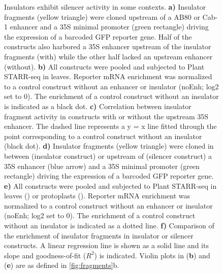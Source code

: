 \documentclass[10pt]{article}
\newcommand{\fignormal}{\scriptsize} %
\newcommand{\usename}[1]{\csname#1\endcsname}
\newif\ifnpc
\newcounter{fig}
\newenvironment{fig}{%
	\begin{figure}[p]%
		\stepcounter{fig}%
		\pdfbookmark{\figurename\ \thefig}{figure\thefig}%
		\tikzsetnextfilename{figure\thefig}%
		\fignormal%
		\centering%
}{%
	\end{figure}%
	\clearpage%
	\ifnpc%
		\makenextpagecaption%
		\global\npcfalse%
	\fi%
}
\newcommand{\titleend}{. }
\newcommand{\nextentry}{ }
\newcommand{\captiontitle}[2][]{#2#1\titleend}
\newif\ifsubfigupper
\newcounter{subfig}[figure]
\newcommand{\subfigrefsep}{\textbf{)}}
\newcommand{\subfigunformatted}[1]{\ifsubfigupper\uppercase{#1}\else\lowercase{#1}\fi}
\newcommand{\plainsubfigref}[1]{\textbf{\subfigunformatted{#1}}}
\newcommand{\subfig}[1]{\textbf{\plainsubfigref{#1}}\subfigrefsep}
\newcommand{\parensubfig}[2][]{(#1\plainsubfigref{#2})}
\begin{document}
		\begin{fig}
			\caption{%
				\captiontitle{Insulators exhibit silencer activity in some contexts}%
				\subfig{A} Insulator fragments (yellow triangle) were cloned upstream of a \usename{AB80} or \usename{Cab-1} enhancer and a 35S minimal promoter (green rectangle) driving the expression of a barcoded GFP reporter gene. Half of the constructs also harbored a \usename{35S} enhancer upstream of the insulator fragments (\usename{with}) while the other half lacked an upstream enhancer (\usename{without}).\nextentry
				\subfig{B} All constructs were pooled and subjected to Plant STARR-seq in \tobacco leaves. Reporter mRNA enrichment was normalized to a control construct without an enhancer or insulator (noEnh; log2 set to 0). The enrichment of a control construct without an insulator is indicated as a black dot.\nextentry
				\subfig{C}  Correlation between insulator fragment activity in constructs with or without the upstream \usename{35S} enhancer. The dashed line represents a y = x line fitted through the point corresponding to a control construct without an insulator (black dot).\nextentry
				\subfig{D} Insulator fragments (yellow triangle) were cloned in between (insulator construct) or upstream of (silencer construct) a \usename{35S} enhancer (blue arrow) and a 35S minimal promoter (green rectangle) driving the expression of a barcoded GFP reporter gene.\nextentry
				\subfig{E} All constructs were pooled and subjected to Plant STARR-seq in \tobacco leaves (\tobacco) or \maize protoplasts (\maize). Reporter mRNA enrichment was normalized to a control construct without an enhancer or insulator (noEnh; log2 set to 0). The enrichment of a control construct without an insulator is indicated as a dotted line.\nextentry
				\subfig{F} Comparison of the enrichment of insulator fragments in insulator or silencer constructs. A linear regression line is shown as a solid line and its slope and goodness-of-fit ($R^2$) is indicated.\nextentry
				Violin plots in \parensubfig{B} and \parensubfig{E} are as defined in \cref{fig:fragments}\subfigunformatted{B}.
			}%
			\label{fig:silencer}%
		\end{fig}
		
\end{document}
